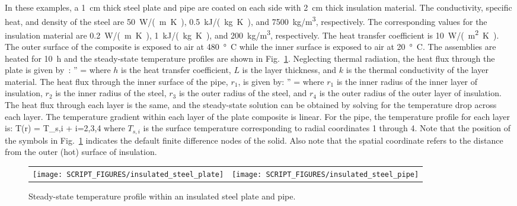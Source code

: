 \documentclass[11pt]{book}
\begin{document}
In these examples, a 1~cm thick steel plate and pipe are coated on each side with 2~cm thick insulation material. The conductivity, specific heat, and density of the steel are 50~\si{W/(m.K)}, 0.5~\si{kJ/(kg.K)}, and 7500~\si{kg/m^3}, respectively. The corresponding values for the insulation material are 0.2~\si{W/(m.K)}, 1~\si{kJ/(kg.K)}, and 200~\si{kg/m^3}, respectively. The heat transfer coefficient is 10~\si{W/(m^2.K)}. The outer surface of the composite is exposed to air at 480~\si{\degree C} while the inner surface is exposed to air at 20~\si{\degree C}. The assemblies are heated for 10~h and the steady-state temperature profiles are shown in Fig.~\ref{insulated_steel_fig}. Neglecting thermal radiation, the heat flux through the plate is given by~\cite{Incropera:1}:
\be
   '' = 
\ee
where $h$ is the heat transfer coefficient, $L$ is the layer thickness, and $k$ is the thermal conductivity of the layer material. The heat flux through the inner surface of the pipe, $r_1$, is given by:
\be
   '' = 
\ee
where $r_1$ is the inner radius of the inner layer of insulation, $r_2$ is the inner radius of the steel, $r_3$ is the outer radius of the steel, and $r_4$ is the outer radius of the outer layer of insulation. The heat flux through each layer is the same, and the steady-state solution can be obtained by solving for the temperature drop across each layer. The temperature gradient within each layer of the plate composite is linear. For the pipe, the temperature profile for each layer is:
\be
   T(r) = T_{s,i} +  \ln {} \quad \quad i=2,3,4
\ee
where $T_{s,i}$ is the surface temperature corresponding to radial coordinates 1 through 4. Note that the position of the symbols in Fig.~\ref{insulated_steel_fig} indicates the default finite difference nodes of the solid. Also note that the spatial coordinate refers to the distance from the outer (hot) surface of insulation.

\begin{figure}[ht]
\noindent
\begin{tabular*}{\textwidth}{l@{\extracolsep{\fill}}r}
\texttt{[image: SCRIPT\_FIGURES/insulated\_steel\_plate]} &
\texttt{[image: SCRIPT\_FIGURES/insulated\_steel\_pipe]}
\end{tabular*}
\caption[The  test cases]{Steady-state temperature profile within an insulated steel plate and pipe.}
\label{insulated_steel_fig}
\end{figure}
\end{document}
